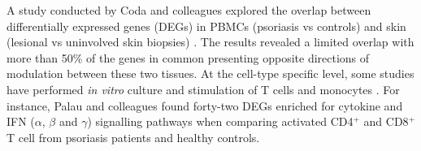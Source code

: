 
A study conducted by Coda and colleagues explored the overlap between differentially expressed genes (DEGs) in PBMCs (psoriasis vs controls) and skin (lesional vs uninvolved skin biopsies) \parencite{Coda2012}. The results revealed a limited overlap with more than 50\% of the genes in common presenting opposite directions of modulation between these two tissues. At the cell-type specific level, some studies have performed \textit{in vitro} culture and stimulation of T cells and monocytes \parencite{Palau2013, Jung2004}. For instance, Palau and colleagues found forty-two DEGs enriched for cytokine and IFN ($\alpha$, $\beta$ and $\gamma$) signalling pathways when comparing activated CD4$^+$ and CD8$^+$ T cell from psoriasis patients and healthy controls. %


